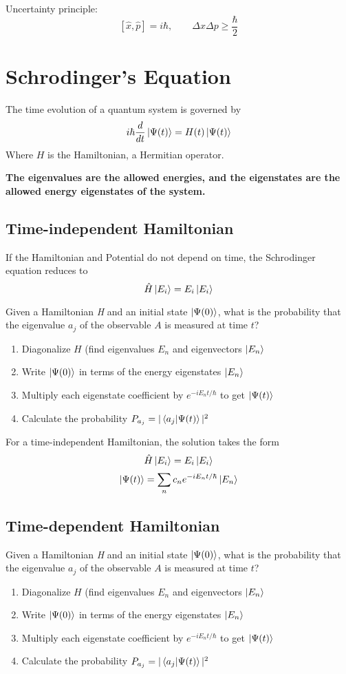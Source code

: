 \documentclass{article}
\begin{document}
Uncertainty principle:
$$
[\hat{x},\hat{p}] = i\hbar , \qquad \Delta x \Delta p \geq \frac{\hbar}{2}
$$


\section{Schrodinger's Equation}
The time evolution of  a quantum system is governed by
$$
  i \hbar \frac{d}{dt} \ket{\Psi(t)} = H(t) \ket{\Psi(t)}
$$
Where $H$ is the Hamiltonian, a Hermitian operator.

\textbf{The eigenvalues are the allowed energies, and the eigenstates are the allowed energy eigenstates of the system.}

\subsection{Time-independent Hamiltonian}
If the Hamiltonian and Potential do not depend on time, the Schrodinger equation reduces to
$$
  \hat{H}\ket{E_i} = E_i\ket{E_i}
$$


Given a Hamiltonian \textit{H} and an initial state $\ket{\Psi(0)}$, what is the probability that the eigenvalue $a_j$ of the observable $A$ is measured at time $t$?

\begin{enumerate}
  \item Diagonalize $H$ (find eigenvalues $E_n$ and eigenvectors $\ket{E_n}$
  \item Write $\ket{\Psi(0)}$ in terms of the energy eigenstates $\ket{E_n}$
  \item Multiply each eigenstate coefficient by $e^{-i E_n t / \hbar}$ to get $\ket{\Psi(t)}$
  \item Calculate the probability $P_{a_j} = |\braket{a_j | \Psi(t)}|^2$
\end{enumerate}

For a time-independent Hamiltonian, the solution takes the form
$$
  \hat{H}\ket{E_i} = E_i \ket{E_i}
$$
$$
  \ket{\Psi(t)} = \sum_n c_n e^{-iE_n t/\hbar}\ket{E_n}
$$

\subsection{Time-dependent Hamiltonian}
Given a Hamiltonian \textit{H} and an initial state $\ket{\Psi(0)}$, what is the probability that the eigenvalue $a_j$ of the observable $A$ is measured at time $t$?

\begin{enumerate}
  \item Diagonalize $H$ (find eigenvalues $E_n$ and eigenvectors $\ket{E_n}$
  \item Write $\ket{\Psi(0)}$ in terms of the energy eigenstates $\ket{E_n}$
  \item Multiply each eigenstate coefficient by $e^{-i E_n t / \hbar}$ to get $\ket{\Psi(t)}$
  \item Calculate the probability $P_{a_j} = |\braket{a_j | \Psi(t)}|^2$
\end{enumerate}
\end{document}
